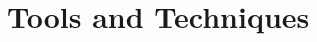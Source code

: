 \documentclass[manuscript,acmsmall,anonymous,review,screen,nonacm=true, authorversion=true]{acmart}
\begin{document}




\section{Tools and Techniques}
\end{document}
